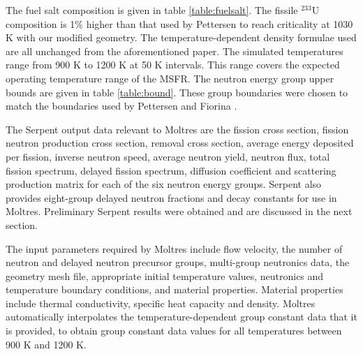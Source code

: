\documentclass{anstrans}
\begin{document}
The fuel salt composition is given in table \ref{table:fuelsalt}. The fissile $^{233}$U composition is 1\% higher than that used by Pettersen \cite{pettersen_coupled_2016} to reach criticality at 1030 K with our modified geometry. The temperature-dependent density formulae used are all unchanged from the aforementioned paper. The simulated temperatures range from 900 K to 1200 K at 50 K intervals. This range covers the expected operating temperature range of the MSFR. The neutron energy group upper bounds are given in table \ref{table:bound}. These group boundaries were chosen to match the boundaries used by Pettersen \cite{pettersen_coupled_2016} and Fiorina \cite{fiorina_modelling_2014}.

The Serpent output data relevant to Moltres are the fission cross section, fission neutron production cross section, removal cross section, average energy deposited per fission, inverse neutron speed, average neutron yield, neutron flux, total fission spectrum, delayed fission spectrum, diffusion coefficient and scattering production matrix for each of the six neutron energy groups. Serpent also provides eight-group delayed neutron fractions and decay constants for use in Moltres. Preliminary Serpent results were obtained and are discussed in the next section.

The input parameters required by Moltres include flow velocity, the number of neutron and delayed neutron precursor groups, multi-group neutronics data, the geometry mesh file, appropriate initial temperature values, neutronics and temperature boundary conditions, and material properties. Material properties include thermal conductivity, specific heat capacity and density. Moltres automatically interpolates the temperature-dependent group constant data that it is provided, to obtain group constant data values for all temperatures between 900 K and 1200 K. 
\end{document}

